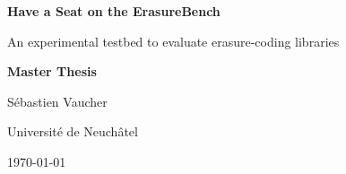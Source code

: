 \documentclass[10pt,conference]{IEEEtran}
\author{\IEEEauthorblockN{\ieeeauthor}
    \IEEEauthorblockA{University of Neuchâtel, Switzerland\\
        \href{mailto:first.last@unine.ch}{first.last@unine.ch}}
}
\title{\ieeetitle}
\newif\ifjmcs
\def\thesistitle{Have a Seat on the ErasureBench}
\def\thesissubtitle{An experimental testbed to evaluate erasure-coding libraries}
\def\thesisauthor{Sébastien Vaucher}
\begin{document}
\ifjmcs
\begin{titlepage}
    \begin{otherlanguage}{australian}
        \begin{center}
            \begin{figure}[t]
                \vspace{0.4in}
            \end{figure}

            {\bfseries\Huge \thesistitle \par
                \Large \vspace{0.1in} \thesissubtitle \par}

            \vspace{0.3in}
            \LARGE{\textbf{Master Thesis} \\}
            \vspace{0.4in}

            {\Large \thesisauthor}

            \vspace{0.3in}
            {\Large Université de Neuchâtel \par}
            \vfill
            {\Large \today \par}

            \vspace{0.9in}


\end{center}
\end{otherlanguage}
\end{titlepage}
\end{document}
